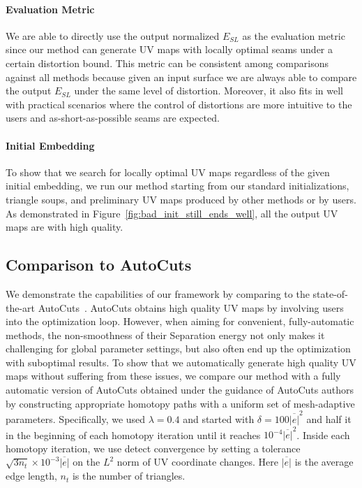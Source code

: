 \paragraph{Evaluation Metric}
We are able to directly use the output normalized $E_{SL}$ as the evaluation metric since our method can generate UV maps with locally optimal seams under a certain distortion bound. This metric can be consistent among comparisons against all methods because given an input surface we are always able to compare the output $E_{SL}$ under the same level of distortion. Moreover, it also fits in well with practical scenarios where the control of distortions are more intuitive to the users and as-short-as-possible seams are expected.

\paragraph{Initial Embedding}
 To show that we search for locally optimal UV maps regardless of the given initial embedding, we run our method starting from our standard initializations, triangle soups, and preliminary UV maps produced by other methods or by users. As demonstrated in Figure~\ref{fig:bad_init_still_ends_well}, all the output UV maps are with high quality.


\subsection{Comparison to AutoCuts}

We demonstrate the capabilities of our framework by comparing to the state-of-the-art AutoCuts~\cite{Poranne2017Autocuts}.
AutoCuts obtains high quality UV maps by involving users into the optimization loop. However, when aiming for convenient, fully-automatic methods, the non-smoothness of their Separation energy not only makes it challenging for global parameter settings, but also often end up the optimization with suboptimal results. To show that we automatically generate high quality UV maps without suffering from these issues, we compare our method with a fully automatic version of AutoCuts obtained under the guidance of AutoCuts authors by constructing appropriate homotopy paths with a uniform set of mesh-adaptive parameters. 
Specifically, we used $\lambda = 0.4$ and started with $\delta=100\overline{|e|}^2$ and half it in the beginning of each homotopy iteration until it reaches $10^{-4}\overline{|e|}^2$. Inside each homotopy iteration, we use detect convergence by setting a tolerance $\sqrt{3n_t}\times10^{-3}\overline{|e|}$ on the $L^2$ norm of UV coordinate changes. Here $\overline{|e|}$ is the average edge length, $n_t$ is the number of triangles.

